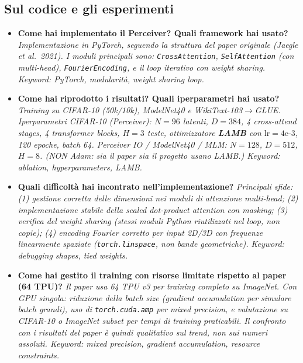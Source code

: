 \documentclass[
  11pt,
]{article}
\begin{document}
\subsection{Sul codice e gli esperimenti}

\begin{itemize}

  \item \textbf{Come hai implementato il Perceiver? Quali framework hai usato?}
  \textit{Implementazione in PyTorch, seguendo la struttura del paper originale (Jaegle et al.\ 2021). I moduli principali sono: \texttt{CrossAttention}, \texttt{SelfAttention} (con multi-head), \texttt{FourierEncoding}, e il loop iterativo con weight sharing. Keyword: PyTorch, modularità, weight sharing loop.}

  \item \textbf{Come hai riprodotto i risultati? Quali iperparametri hai usato?}
  \textit{Training su CIFAR-10 (50k/10k), ModelNet40 e WikiText-103$\to$GLUE. Iperparametri CIFAR-10 (Perceiver): $N=96$ latenti, $D=384$, 4 cross-attend stages, 4 transformer blocks, $H=3$ teste, ottimizzatore \textbf{LAMB} con $\text{lr}=4\text{e-}3$, 120 epoche, batch 64. Perceiver IO / ModelNet40 / MLM: $N=128$, $D=512$, $H=8$. (NON Adam: sia il paper sia il progetto usano LAMB.) Keyword: ablation, hyperparameters, LAMB.}

  \item \textbf{Quali difficoltà hai incontrato nell'implementazione?}
  \textit{Principali sfide: (1) gestione corretta delle dimensioni nei moduli di attenzione multi-head; (2) implementazione stabile della scaled dot-product attention con masking; (3) verifica del weight sharing (stessi moduli Python riutilizzati nel loop, non copie); (4) encoding Fourier corretto per input 2D/3D con frequenze \emph{linearmente} spaziate (\texttt{torch.linspace}, non bande geometriche). Keyword: debugging shapes, tied weights.}

  \item \textbf{Come hai gestito il training con risorse limitate rispetto al paper (64 TPU)?}
  \textit{Il paper usa 64 TPU v3 per training completo su ImageNet. Con GPU singola: riduzione della batch size (gradient accumulation per simulare batch grandi), uso di \texttt{torch.cuda.amp} per mixed precision, e valutazione su CIFAR-10 o ImageNet subset per tempi di training praticabili. Il confronto con i risultati del paper è quindi qualitativo sul trend, non sui numeri assoluti. Keyword: mixed precision, gradient accumulation, resource constraints.}

\end{itemize}
\end{document}
